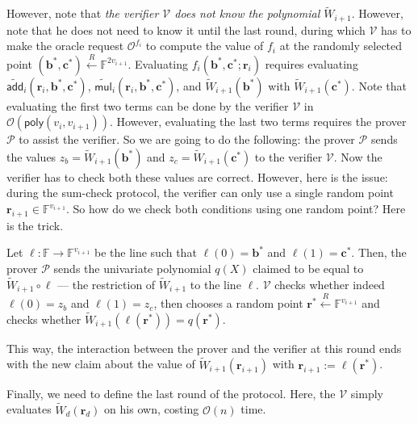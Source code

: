 \documentclass{gkr-template}
\begin{document}
However, note that \textit{the verifier $\mathcal{V}$ does not know the
polynomial $\widetilde{W}_{i+1}$}. However, note that he does not need to know
it until the last round, during which $\mathcal{V}$ has to make the oracle
request $\mathcal{O}^{f_i}$ to compute the value of $f_i$ at the randomly
selected point $(\boldsymbol{b}^*, \boldsymbol{c}^*) \xleftarrow{R}
\mathbb{F}^{2v_{i+1}}$. Evaluating $f_i(\boldsymbol{b}^*, \boldsymbol{c}^*;
\mathbf{r}_i)$ requires evaluating
$\widetilde{\mathsf{add}}_i(\mathbf{r}_i,\boldsymbol{b}^*,\boldsymbol{c}^*)$,
$\widetilde{\mathsf{mul}}_i(\mathbf{r}_i,\boldsymbol{b}^*,\boldsymbol{c}^*)$,
and $\widetilde{W}_{i+1}(\boldsymbol{b}^*)$ with
$\widetilde{W}_{i+1}(\boldsymbol{c}^*)$. Note that evaluating the first two
terms can be done by the verifier $\mathcal{V}$ in
$\mathcal{O}(\mathsf{poly}(v_i,v_{i+1}))$. However, evaluating the last two
terms requires the prover $\mathcal{P}$ to assist the verifier. So we are going
to do the following: the prover $\mathcal{P}$ sends the values
$z_b=\widetilde{W}_{i+1}(\boldsymbol{b}^*)$ and
$z_c=\widetilde{W}_{i+1}(\boldsymbol{c}^*)$ to the verifier $\mathcal{V}$. Now
the verifier has to check both these values are correct. However, here is the
issue: during the sum-check protocol, the verifier can only use a single random
point $\mathbf{r}_{i+1} \in \mathbb{F}^{v_{i+1}}$. So how do we check both 
conditions using one random point? Here is the trick.

\begin{proposition}
    Let $\ell: \mathbb{F} \to \mathbb{F}^{v_{i+1}}$ be the line such that
    $\ell(0)=\boldsymbol{b}^*$ and $\ell(1)=\boldsymbol{c}^*$. Then, the prover
    $\mathcal{P}$ sends the univariate polynomial $q(X)$ claimed to be equal to
    $\widetilde{W}_{i+1} \circ \ell$ --- the restriction of
    $\widetilde{W}_{i+1}$ to the line $\ell$. $\mathcal{V}$ checks whether
    indeed $\ell(0)=z_b$ and $\ell(1)=z_c$, then chooses a random point
    $\mathbf{r}^* \xleftarrow{R} \mathbb{F}^{v_{i+1}}$ and checks whether
    $\widetilde{W}_{i+1}(\ell(\mathbf{r}^*)) = q(\mathbf{r}^*)$.
\end{proposition}

This way, the interaction between the prover and the verifier at this round ends
with the new claim about the value of $\widetilde{W}_{i+1}(\mathbf{r}_{i+1})$
with $\mathbf{r}_{i+1} := \ell(\mathbf{r}^*)$.

Finally, we need to define the last round of the protocol. Here, 
the $\mathcal{V}$ simply evaluates $\widetilde{W}_d(\mathbf{r}_d)$
on his own, costing $\mathcal{O}(n)$ time. 
\end{document}
